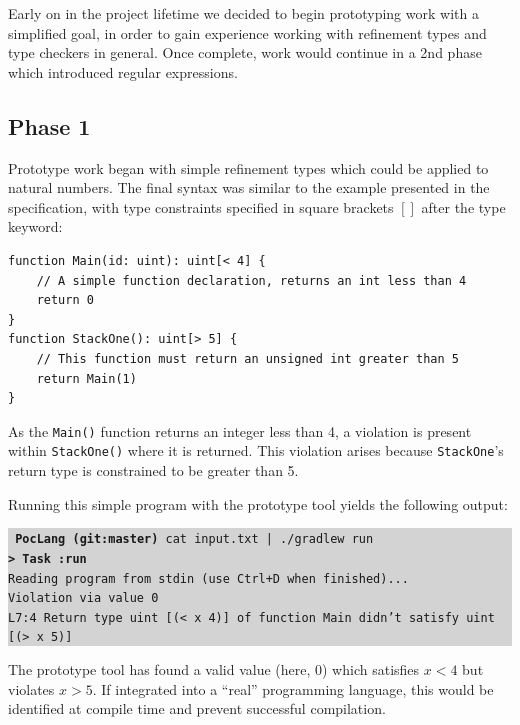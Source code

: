 \documentclass[a4paper]{article}
\newcommand{\termbox}[1] {\colorbox{lightgrey}{\parbox{\textwidth}{\vspace{.75\baselineskip}\centering\parbox{0.95\textwidth}{ \sffamily#1\vspace{.75\baselineskip}}}}}
\begin{document}
    Early on in the project lifetime we decided to begin prototyping work with a simplified goal, in order to gain experience working with refinement types and type checkers in general. Once complete, work would continue in a 2nd phase which introduced regular expressions.
    
    \subsection*{Phase 1}\hfill
    
    Prototype work began with simple refinement types which could be applied to natural numbers. The final syntax was similar to the example presented in the specification, with type constraints specified in square brackets $[ ]$ after the type keyword:
    
    \begin{verbatim}
function Main(id: uint): uint[< 4] {
    // A simple function declaration, returns an int less than 4
    return 0
}
function StackOne(): uint[> 5] {
    // This function must return an unsigned int greater than 5
    return Main(1)
}
    \end{verbatim}
    
    As the \texttt{Main()} function returns an integer less than 4, a violation is present within \texttt{StackOne()} where it is returned. This violation arises because \texttt{StackOne}'s return type is constrained to be greater than 5.
   
    Running this simple program with the prototype tool yields the following output:
    

    \termbox{
        \texttt{\textcolor{term-green}{\fallbackmono{➜}} \ttfamily \textbf{\textcolor{term-dir}{PocLang} \textcolor{term-git}{(git:}\textcolor{term-branch}{master}\textcolor{term-git}{)}} cat input.txt | ./gradlew run}\\
        \texttt{\textbf{> Task :run}}\\
        \textcolor{term-green}{\texttt{Reading program from stdin (use Ctrl+D when finished)...}}\\
        \textcolor{id7-ruby-red}{\texttt{Violation via value 0}}\\
        \textcolor{id7-ruby-red}{\texttt{L7:4 Return type uint [(< x 4)] of function Main didn't satisfy uint [(> x 5)]}}
    }
    
    The prototype tool has found a valid value (here, $0$) which satisfies $x < 4$ but violates $x > 5$. If integrated into a ``real'' programming language, this would be identified at compile time and prevent successful compilation.
    
\end{document}
